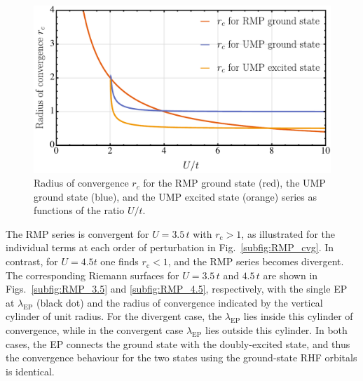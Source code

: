 \documentclass[aps,prb,reprint,noshowkeys,linenumbers,superscriptaddress]{revtex4-1}
\newcommand{\rc}{r_{\text{c}}}
\newcommand{\lep}{\lambda_{\text{EP}}}
\begin{document}
\begin{figure}[htb]
	\includegraphics[width=\linewidth]{RadConv}
	\caption{
	Radius of convergence $r_c$ for the RMP ground state (red), the UMP ground state (blue), and the UMP excited state (orange) 
    series as functions of the ratio $U/t$.
	\label{fig:RadConv}}
\end{figure}

The RMP series is convergent for $U = 3.5\,t$ with $\rc > 1$, as illustrated for the individual terms at each order
of perturbation in Fig.~\ref{subfig:RMP_cvg}.
In contrast, for $U = 4.5t$ one finds $\rc < 1$, and the RMP series becomes divergent.
The corresponding Riemann surfaces for $U = 3.5\,t$ and $4.5\,t$ are shown in Figs.~\ref{subfig:RMP_3.5} and 
\ref{subfig:RMP_4.5}, respectively, with the single EP at $\lep$ (black dot) and the radius of convergence indicated
by the vertical cylinder of unit radius.
For the divergent case, the $\lep$ lies inside this cylinder of convergence, while in the convergent case $\lep$ lies
outside this cylinder.
In both cases, the EP connects the ground state with the doubly-excited state, and thus the convergence behaviour
for the two states using the ground-state RHF orbitals is identical.
\end{document}
